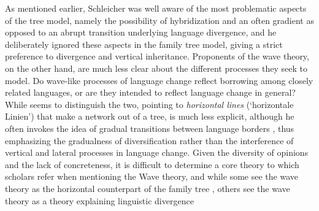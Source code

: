 \documentclass[svgnames,12pt]{scrartcl}
\begin{document}
{As mentioned earlier, Schleicher was well aware of the most problematic aspects of the tree
model, namely the possibility of hybridization and an often gradient as opposed to an abrupt
transition underlying language divergence, and he deliberately ignored these aspects in the family
tree model, giving a strict preference to divergence and vertical inheritance. Proponents of the
wave theory, on the other hand, are much less clear about the different processes they seek to
model. Do wave-like processes of language change reflect borrowing among closely related languages,
or are they intended to reflect language change in general? While \citet{Schuchardt1870} seems to distinguish
the two, pointing to \emph{horizontal lines} (`{horizontale Linien}') that make a network out of a
tree, \citet{Schmidt1872} is much less explicit, although he often invokes the idea of gradual
transitions between language borders \citep[200]{Schmidt1875}, thus emphasizing the gradualness of
diversification rather than the interference of vertical and lateral processes in language change.
Given the diversity of opinions and the lack of concreteness, it is
difficult to determine a core theory to which scholars refer when mentioning the Wave theory, and
while some see the wave theory as the horizontal counterpart of the family tree \citep[74]{Baxter2006a},
others see the wave theory as a theory explaining linguistic divergence \citep[188-191]{Campbell1999}

}
\end{document}

